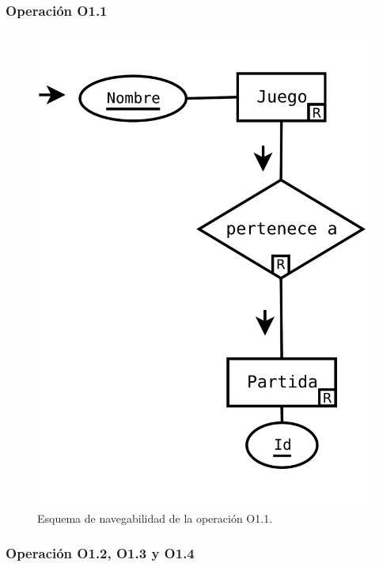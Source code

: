 \subsubsection{Operación O1.1}

\begin{figure}[h!]
\centering
\includegraphics[width=0.7\linewidth]{../Diagramas/pdf/Op1-Consulta.pdf}
\caption{Esquema de navegabilidad de la operación O1.1.}

\label{fig:O1.1}
\end{figure}

\subsubsection{Operación O1.2, O1.3 y O1.4}

